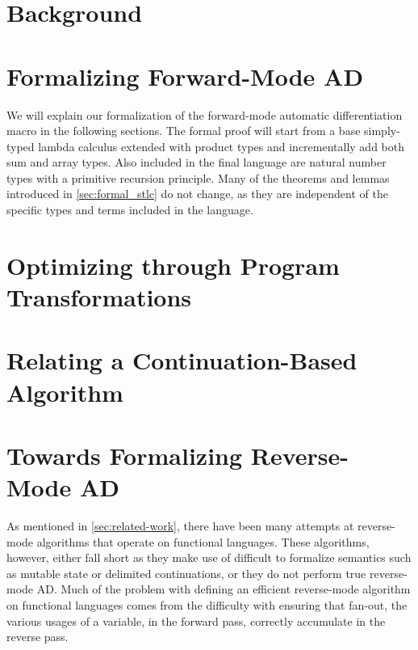 \documentclass[11pt, final]{article}
\begin{document}


\newpage


\newpage

\setcounter{page}{3}
\tableofcontents
\newpage


\section{Background}\label{sec:bg}





% 

\section{Formalizing Forward-Mode AD}\label{sec:forward}
  We will explain our formalization of the forward-mode automatic differentiation macro in the following sections.
  The formal proof will start from a base simply-typed lambda calculus extended with product types and incrementally add both sum and array types.
  Also included in the final language are natural number types with a primitive recursion principle.
  Many of the theorems and lemmas introduced in \cref{sec:formal_stlc} do not change, as they are independent of the specific types and terms included in the language.
  
  
  
\section{Optimizing through Program Transformations}\label{sec:opt}
  
\section{Relating a Continuation-Based Algorithm}\label{sec:continuation-base}
  
\section{Towards Formalizing Reverse-Mode AD}\label{sec:rev}
  As mentioned in \cref{sec:related-work}, there have been many attempts at reverse-mode algorithms that operate on functional languages.
  These algorithms, however, either fall short as they make use of difficult to formalize semantics such as mutable state or delimited continuations, or they do not perform true reverse-mode AD.
  Much of the problem with defining an efficient reverse-mode algorithm on functional languages comes from the difficulty with ensuring that fan-out, the various usages of a variable, in the forward pass, correctly accumulate in the reverse pass.
\end{document}
